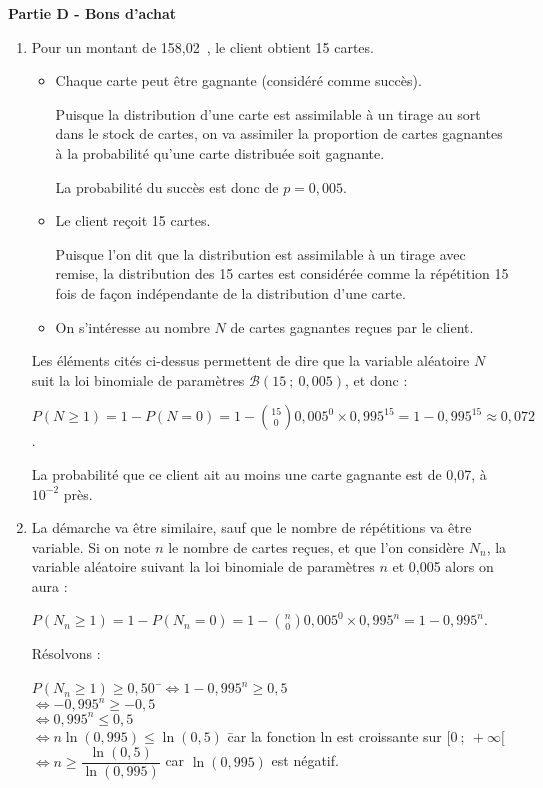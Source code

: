 \documentclass[10pt]{article}
\newcommand{\euro}{\eurologo{}}
\begin{document}
\bigskip

\textbf{Partie D - Bons d'achat}
	
\medskip
	
\begin{enumerate}
	\item Pour un montant de 158,02~\euro{}, le client obtient 15 cartes.
		
	\begin{itemize}
		\item Chaque carte peut être gagnante (considéré comme succès).
			
Puisque la distribution d'une carte est assimilable à un tirage au sort dans le stock de cartes, on va assimiler la proportion de cartes gagnantes à la probabilité qu'une carte distribuée soit gagnante.
	
La probabilité du succès est donc de $p = 0,005$.
			
		\item Le client reçoit 15 cartes.
	
Puisque l'on dit que la distribution est assimilable à un tirage avec remise, la distribution des 15 cartes est considérée comme la répétition 15 fois de façon indépendante de la distribution d'une carte.
	
	\item On s'intéresse au nombre $N$ de cartes gagnantes reçues par le client.
		\end{itemize}
	
Les éléments cités ci-dessus permettent de dire que la variable aléatoire $N$ suit la loi binomiale de paramètres $\mathcal{B}(15~;~0,005)$, et donc :
	
$P(N \geqslant 1) = 1 - P(N = 0) = 1 - \displaystyle \binom{15}{0} 0,005^0 \times 0,995^{15} = 1 - 0,995^{15} \approx 0,072$.
		
La probabilité que ce client ait au moins une carte gagnante est de 0,07, à $10^{-2}$ près.
		
	\item La démarche va être similaire, sauf que le nombre de répétitions va être variable. Si on note $n$ le nombre de cartes reçues, et que l'on considère $N_n$, la variable aléatoire suivant la loi binomiale de paramètres $n$ et 0,005 alors on aura :
		
$P(N_n \geqslant 1) = 1 - P\left(N_n = 0\right) = 1 - \displaystyle \binom{n}{0} 0,005^0 \times 0,995^{n} = 1 - 0,995^{n}$.
		
Résolvons :
		
\begin{tabbing}
$P\left(N_n \geqslant 1\right) \geqslant 0,50$~\=$\iff 1 - 0,995^n \geqslant 0,5$\\
\> $\iff - 0,995^{n} \geqslant -0,5$\\
\> $\iff 0,995^n \leqslant 0,5$\\
\> $\iff n \ln(0,995) \leqslant \ln(0,5)$ \quad \= car la fonction ln est croissante sur $[0~;~+\infty[$\\
\> $\iff n \geqslant \dfrac{\ln(0,5)}{\ln(0,995)}$ \> car $\ln(0,995)$ est négatif.
		\end{tabbing}
		

\end{enumerate}
\end{document}
